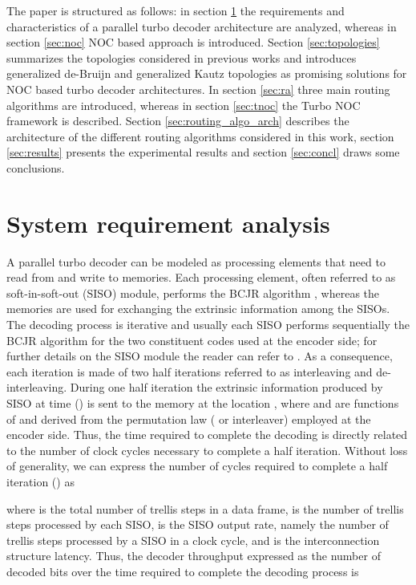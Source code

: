 \documentclass[10pt,twocolumn,journal]{IEEEtran}
\begin{document}
The paper is structured as follows: in section \ref{sec:system_analysis} the requirements and characteristics of a
parallel turbo decoder architecture are analyzed, whereas in section \ref{sec:noc} NOC based approach is 
introduced. Section \ref{sec:topologies} summarizes the topologies considered in previous works and introduces generalized 
de-Bruijn and generalized Kautz topologies as promising solutions for NOC based turbo decoder architectures. 
In section \ref{sec:ra} three main routing algorithms are introduced, whereas in section \ref{sec:tnoc} the Turbo NOC 
framework is described. Section \ref{sec:routing_algo_arch} describes the architecture of the different routing algorithms 
considered in this work, section \ref{sec:results} presents the experimental results and section \ref{sec:concl} draws 
some conclusions.

\section{System requirement analysis}
\label{sec:system_analysis}

A parallel turbo decoder can be modeled as  processing elements that need to read from and write to  memories. 
Each processing element, often referred to as soft-in-soft-out (SISO) module, performs the BCJR 
algorithm \cite{bahl_TrIT94}, whereas the memories are used for exchanging the extrinsic information  among 
the SISOs. The decoding process is iterative and usually each SISO performs sequentially the BCJR algorithm for the two constituent 
codes used at the encoder side; for further details on the SISO module the reader can refer to \cite{benedetto_ETR98}.
As a consequence, each iteration is made of two half iterations referred to as 
interleaving and de-interleaving. During one half iteration the extrinsic information produced by SISO  at time  
 () 
is sent to the memory  at the location , where  and  are functions of  and 
derived from 
the permutation law ( or interleaver) employed at the encoder side. 
Thus, the time required to complete the decoding is directly related to the number of clock cycles necessary to 
complete a half iteration. 
Without loss of generality, we can express the number of cycles required to complete a 
half iteration () as 

where  is the total number of trellis steps in a data frame,  is 
the number of trellis steps processed by each SISO,  is the SISO output rate, namely the number of trellis steps processed by 
a SISO in a clock cycle, and  is the 
interconnection structure latency.
Thus, the decoder throughput expressed as the number of decoded bits over the time required to complete the decoding 
process is
\end{document}
